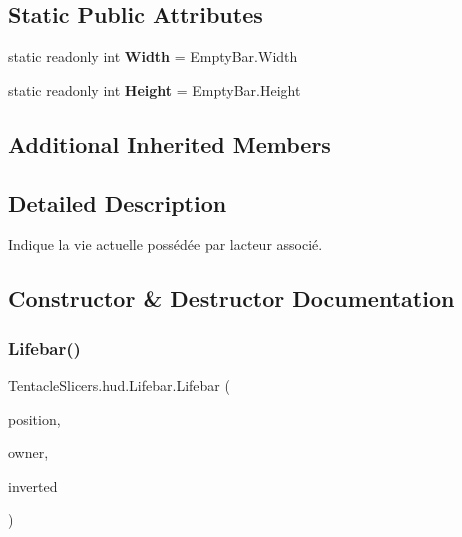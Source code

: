 \subsection*{Static Public Attributes}
\begin{DoxyCompactItemize}
\item 
\mbox{\label{class_tentacle_slicers_1_1hud_1_1_lifebar_a4fb0b8e3c484a595961b507e3ef59f8e}} 
static readonly int {\bfseries Width} = Empty\+Bar.\+Width
\item 
\mbox{\label{class_tentacle_slicers_1_1hud_1_1_lifebar_a420306a2cfb1402cc6f3bbbb7bfcc869}} 
static readonly int {\bfseries Height} = Empty\+Bar.\+Height
\end{DoxyCompactItemize}
\subsection*{Additional Inherited Members}


\subsection{Detailed Description}
Indique la vie actuelle possédée par l\textquotesingle{}acteur associé. 



\subsection{Constructor \& Destructor Documentation}
\mbox{\label{class_tentacle_slicers_1_1hud_1_1_lifebar_a3dcac14f3effb59f113af80ade641141}} 
\subsubsection{\texorpdfstring{Lifebar()}{Lifebar()}}
{\footnotesize\ttfamily Tentacle\+Slicers.\+hud.\+Lifebar.\+Lifebar (\begin{DoxyParamCaption}\item[{Point}]{position,  }\item[{\hyperlink{class_tentacle_slicers_1_1actors_1_1_player_character}{Player\+Character}}]{owner,  }\item[{bool}]{inverted }\end{DoxyParamCaption})}



